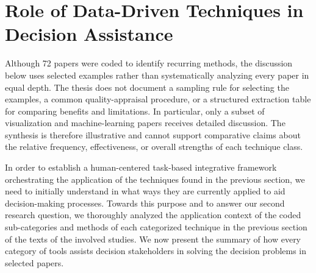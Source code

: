 \documentclass{sfuthesis}
\begin{document}
\section{Role of Data-Driven Techniques in Decision Assistance}
Although 72 papers were coded to identify recurring methods, the discussion below uses selected examples rather than systematically analyzing every paper in equal depth. The thesis does not document a sampling rule for selecting the examples, a common quality-appraisal procedure, or a structured extraction table for comparing benefits and limitations. In particular, only a subset of visualization and machine-learning papers receives detailed discussion. The synthesis is therefore illustrative and cannot support comparative claims about the relative frequency, effectiveness, or overall strengths of each technique class.\par
In order to establish a human-centered task-based integrative framework orchestrating the application of the techniques found in the previous section, we need to initially understand in what ways they are currently applied to aid decision-making processes. Towards this purpose and to answer our second research question, we thoroughly analyzed the application context of the coded sub-categories and methods of each categorized technique in the previous section of the texts of the involved studies. We now present the summary of how every category of tools assists decision stakeholders in solving the decision problems in selected papers.\par
\end{document}
